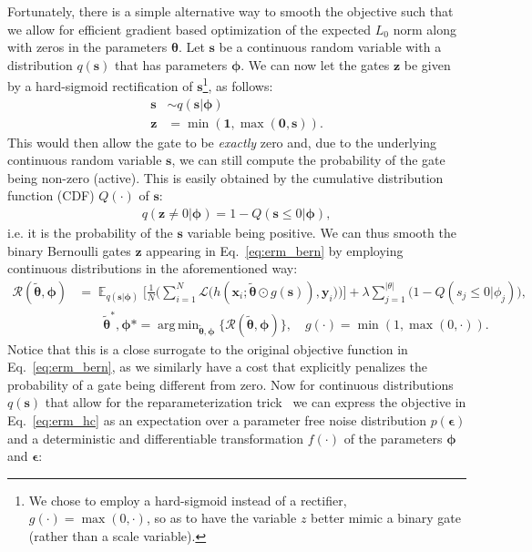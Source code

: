 \documentclass{article} %
\DeclareMathOperator{\E}{\mathbb{E}}
\def\!#1{\boldsymbol{#1}}
\def\*#1{\mathbf{#1}}
\DeclareMathOperator*{\argmin}{arg\,min}
\begin{document}
Fortunately, there is a simple alternative way to smooth the objective such that we allow for efficient gradient based optimization of the expected $L_0$ norm along with zeros in the parameters $\!\theta$. Let $\*s$ be a continuous random variable with a distribution $q(\*s)$ that has parameters $\!\phi$. We can now let the gates $\*z$ be given by a hard-sigmoid rectification of $\*s$\footnote{We chose to employ a hard-sigmoid instead of a rectifier, $g(\cdot) = \max(0, \cdot)$, so as to have the variable $z$ better mimic a binary gate (rather than a scale variable).}, as follows: 
\begin{align}
    \*s &\sim q(\*s | \!\phi)\\
    \*z &= \min(\*1, \max(\*0, \*s)).
\end{align}
This would then allow the gate to be \emph{exactly} zero and, due to the underlying continuous random variable $\*s$, we can still compute the probability of the gate being non-zero (active). This is easily obtained by the cumulative distribution function (CDF) $Q(\cdot)$ of $\*s$:
\begin{align}
    q(\*z \neq 0| \!\phi) = 1 - Q(\*s \leq 0|\!\phi),
\end{align}
i.e. it is the probability of the $\*s$ variable being positive. We can thus smooth the binary Bernoulli gates $\*z$ appearing in Eq.~\ref{eq:erm_bern} by employing continuous distributions in the aforementioned way:
\begin{align}
	\mathcal{R}(\tilde{\!\theta}, \!\phi) & = \E_{q(\*s|\!\phi)}\bigg[\frac{1}{N}\bigg(\sum_{i=1}^{N}\mathcal{L}\big(h(\*x_i; \tilde{\!\theta}\odot g(\*s)), \*y_i\big)\bigg)\bigg] + \lambda \sum_{j=1}^{|\theta|}\big(1 - Q(s_j \leq 0|\phi_j)\big),\label{eq:erm_hc}\\
	& \qquad \tilde{\!\theta}^*, \!\phi* = \argmin_{\tilde{\!\theta}, \!\phi}\{\mathcal{R}(\tilde{\!\theta}, \!\phi)\}\nonumber, \quad g(\cdot) = \min(1, \max(0, \cdot)). 
\end{align}
Notice that this is a close surrogate to the original objective function in Eq.~\ref{eq:erm_bern}, as we similarly have a cost that explicitly penalizes the probability of a gate being different from zero. Now for continuous distributions $q(\*s)$ that allow for the reparameterization trick~\citep{kingma2013auto,rezende2014stochastic} we can express the objective in Eq.~\ref{eq:erm_hc} as an expectation over a parameter free noise distribution $p(\!\epsilon)$ and a deterministic and differentiable transformation $f(\cdot)$ of the parameters $\!\phi$ and $\!\epsilon$: 
\end{document}
